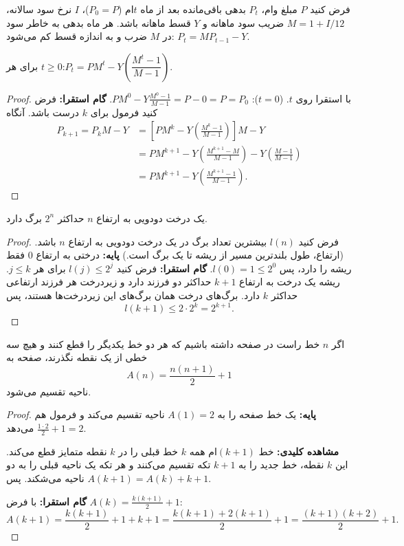 \begin{example}
فرض کنید $P$ مبلغ وام، $P_t$ بدهی باقی‌مانده بعد از ماه $t$ام ($P_0=P$)، $I$ نرخ سود سالانه، $M=1+I/12$ ضریب سود ماهانه و $Y$ قسط ماهانه باشد. هر ماه بدهی به خاطر سود در $M$ ضرب و به اندازه قسط کم می‌شود: $P_t=MP_{t-1}-Y$.
\end{example}

\begin{theorem}
برای هر $t\ge0$:\quad $P_t=PM^t-Y\left(\dfrac{M^t-1}{M-1}\right)$.
\end{theorem}
\begin{proof}
با استقرا روی $t$.
 ($t=0$): $PM^0-Y\frac{M^0-1}{M-1}=P-0=P=P_0$.
\textbf{گام استقرا:} فرض کنید فرمول برای $k$ درست باشد. آنگاه
\begin{align*}
P_{k+1}=P_kM-Y
&=\left[PM^k-Y\left(\frac{M^k-1}{M-1}\right)\right]M-Y\\
&=PM^{k+1}-Y\left(\frac{M^{k+1}-M}{M-1}\right)-Y\left(\frac{M-1}{M-1}\right)\\
&=PM^{k+1}-Y\left(\frac{M^{k+1}-1}{M-1}\right).
\end{align*}
\end{proof}

\begin{theorem}
یک درخت دودویی به ارتفاع $n$ حداکثر $2^n$ برگ دارد.
\end{theorem}
\begin{proof}
فرض کنید $l(n)$ بیشترین تعداد برگ در یک درخت دودویی به ارتفاع $n$ باشد. (ارتفاع، طول بلندترین مسیر از ریشه تا یک برگ است.)
\textbf{پایه:} درختی به ارتفاع $0$ فقط ریشه را دارد، پس $l(0)=1\le2^0$.
\textbf{گام استقرا:} فرض کنید $l(j)\le 2^j$ برای هر $j\le k$. ریشه یک درخت به ارتفاع $k+1$ حداکثر دو فرزند دارد و زیردرخت هر فرزند ارتفاعی حداکثر $k$ دارد. برگ‌های درخت همان برگ‌های این زیردرخت‌ها هستند، پس
\[l(k+1)\le 2\cdot 2^k=2^{k+1}.\]
\end{proof}

\begin{theorem}
اگر $n$ خط راست در صفحه داشته باشیم که هر دو خط یکدیگر را قطع کنند و هیچ سه خطی از یک نقطه نگذرند، صفحه به
\[A(n)=\frac{n(n+1)}{2}+1\]
ناحیه تقسیم می‌شود.
\end{theorem}
\begin{proof}
\textbf{پایه:} یک خط صفحه را به $A(1)=2$ ناحیه تقسیم می‌کند و فرمول هم $\frac{1\cdot2}{2}+1=2$ می‌دهد.

\textbf{مشاهده کلیدی:} خط $(k+1)$ام همه $k$ خط قبلی را در $k$ نقطه متمایز قطع می‌کند. این $k$ نقطه، خط جدید را به $k+1$ تکه تقسیم می‌کنند و هر تکه یک ناحیه قبلی را به دو ناحیه می‌شکند. پس $A(k+1)=A(k)+k+1$.

\textbf{گام استقرا:} با فرض $A(k)=\frac{k(k+1)}{2}+1$:
\[A(k+1)=\frac{k(k+1)}{2}+1+k+1=\frac{k(k+1)+2(k+1)}{2}+1=\frac{(k+1)(k+2)}{2}+1.\]
\end{proof}

